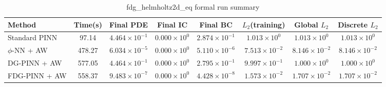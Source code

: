 \begin{table}[h]
\centering
\caption{fdg_helmholtz2d_eq formal run summary}
\begin{adjustbox}{max width=\textwidth}
\scriptsize
\begin{tabular}{lccccccc}
\toprule
Method & Time(s) & Final PDE & Final IC & Final BC & $L_2$(training) & Global $L_2$ & Discrete $L_2$ \\
\midrule
Standard PINN & 97.14 & $4.464\times10^{-1}$ & $0.000\times10^{0}$ & $2.874\times10^{-1}$ & $1.013\times10^{0}$ & $1.013\times10^{0}$ & $1.013\times10^{0}$ \\
$\phi$-NN + AW & 478.27 & $6.034\times10^{-5}$ & $0.000\times10^{0}$ & $5.110\times10^{-6}$ & $7.513\times10^{-2}$ & $8.146\times10^{-2}$ & $8.146\times10^{-2}$ \\
DG-PINN + AW & 577.05 & $4.464\times10^{-1}$ & $0.000\times10^{0}$ & $2.795\times10^{-1}$ & $9.997\times10^{-1}$ & $1.000\times10^{0}$ & $1.000\times10^{0}$ \\
FDG-PINN + AW & 558.37 & $9.483\times10^{-7}$ & $0.000\times10^{0}$ & $4.428\times10^{-8}$ & $1.573\times10^{-2}$ & $1.707\times10^{-2}$ & $1.707\times10^{-2}$ \\
\bottomrule
\end{tabular}
\end{adjustbox}
\end{table}

